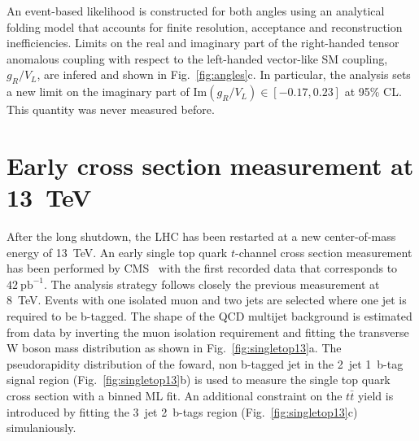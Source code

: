\documentclass{PoS}
\begin{document}
An event-based likelihood is constructed for both angles using an analytical folding model that accounts for finite resolution, acceptance and reconstruction inefficiencies. Limits on the real and imaginary part of the right-handed tensor anomalous coupling with respect to the left-handed vector-like SM coupling, $g_{R}/V_{L}$, are infered and shown in Fig.~\ref{fig:angles}c. In particular, the analysis sets a new limit on the imaginary part of $\mathrm{Im}(g_{R}/V_{L})\in[-0.17,0.23]$ at 95\% CL. This quantity was never measured before.


\section{Early cross section measurement at 13~TeV}

After the long shutdown, the LHC has been restarted at a new center-of-mass energy of 13~TeV. An early single top quark $t$-channel cross section measurement has been performed by CMS~\cite{CMS-PAS-TOP-15-004} with the first recorded data that corresponds to $42~\mathrm{pb}^{-1}$.
The analysis strategy follows closely the previous measurement at 8~TeV. Events with one isolated muon and two jets are selected where one jet is required to be b-tagged. The shape of the QCD multijet background is estimated from data by inverting the muon isolation requirement and fitting the transverse W boson mass distribution as shown in Fig.~\ref{fig:singletop13}a. The pseudorapidity distribution of the foward, non b-tagged jet in the 2~jet 1~b-tag signal region (Fig.~\ref{fig:singletop13}b) is used to measure the single top quark cross section with a binned ML fit. An additional constraint on the $t\bar{t}$ yield is introduced by fitting the 3~jet 2~b-tags region (Fig.~\ref{fig:singletop13}c) simulaniously.
\end{document}
